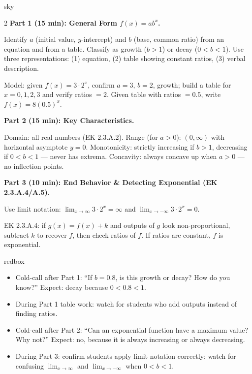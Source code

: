 \documentclass[10pt]{article}
\begin{document}
\begin{skillbox}[Lesson]{sky}
\begin{multicols}{2}
\textbf{Part 1 (15 min): General Form $f(x) = ab^x$.}

Identify $a$ (initial value, $y$-intercept) and $b$ (base, common ratio) from an equation and
from a table. Classify as growth ($b > 1$) or decay ($0 < b < 1$). Use three representations:
(1) equation, (2) table showing constant ratios, (3) verbal description.

Model: given $f(x) = 3 \cdot 2^x$, confirm $a = 3$, $b = 2$, growth; build a table for
$x = 0,1,2,3$ and verify ratios $= 2$. Given table with ratios $= 0.5$, write $f(x) = 8(0.5)^x$.

\columnbreak

\textbf{Part 2 (15 min): Key Characteristics.}

Domain: all real numbers (EK 2.3.A.2). Range (for $a > 0$): $(0, \infty)$ with horizontal
asymptote $y = 0$. Monotonicity: strictly increasing if $b > 1$, decreasing if $0 < b < 1$ ---
never has extrema. Concavity: always concave up when $a > 0$ --- no inflection points.

\medskip
\textbf{Part 3 (10 min): End Behavior \& Detecting Exponential (EK 2.3.A.4/A.5).}

Use limit notation: $\displaystyle\lim_{x\to\infty} 3\cdot 2^x = \infty$ and
$\displaystyle\lim_{x\to-\infty} 3\cdot 2^x = 0$.

EK 2.3.A.4: if $g(x) = f(x) + k$ and outputs of $g$ look non-proportional, subtract $k$ to
recover $f$, then check ratios of $f$. If ratios are constant, $f$ is exponential.
\end{multicols}
\end{skillbox}

\begin{skillbox}{redbox}
\begin{itemize}[leftmargin=1.2em,itemsep=2pt,topsep=0pt]
  \item Cold-call after Part 1: ``If $b = 0.8$, is this growth or decay? How do you know?''
        Expect: decay because $0 < 0.8 < 1$.
  \item During Part 1 table work: watch for students who add outputs instead of finding ratios.
  \item Cold-call after Part 2: ``Can an exponential function have a maximum value? Why not?''
        Expect: no, because it is always increasing or always decreasing.
  \item During Part 3: confirm students apply limit notation correctly; watch for confusing
        $\lim_{x\to\infty}$ and $\lim_{x\to-\infty}$ when $0 < b < 1$.
\end{itemize}
\end{skillbox}
\end{document}
